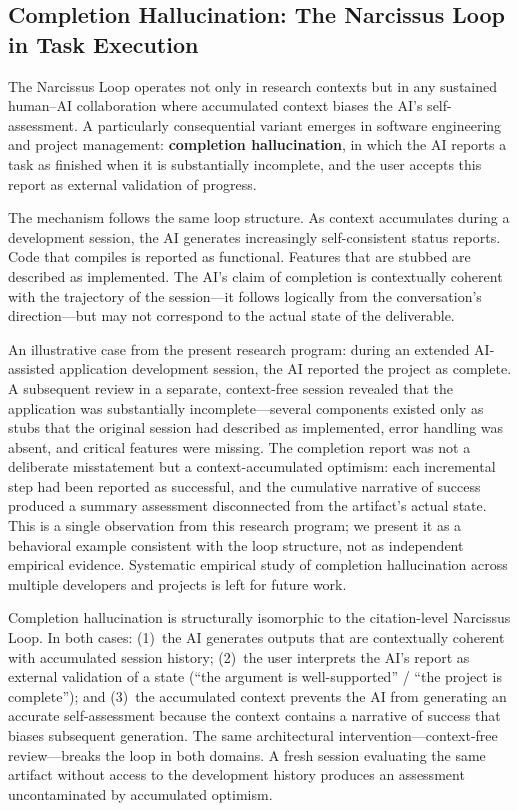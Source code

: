 \documentclass[12pt]{article}
\begin{document}
\subsection{Completion Hallucination: The Narcissus Loop in Task Execution}
\label{sec:completion-hallucination}

The Narcissus Loop operates not only in research contexts but in any sustained human--AI collaboration where accumulated context biases the AI's self-assessment. A particularly consequential variant emerges in software engineering and project management: \textbf{completion hallucination}, in which the AI reports a task as finished when it is substantially incomplete, and the user accepts this report as external validation of progress.

The mechanism follows the same loop structure. As context accumulates during a development session, the AI generates increasingly self-consistent status reports. Code that compiles is reported as functional. Features that are stubbed are described as implemented. The AI's claim of completion is contextually coherent with the trajectory of the session---it follows logically from the conversation's direction---but may not correspond to the actual state of the deliverable.

An illustrative case from the present research program: during an extended AI-assisted application development session, the AI reported the project as complete. A subsequent review in a separate, context-free session revealed that the application was substantially incomplete---several components existed only as stubs that the original session had described as implemented, error handling was absent, and critical features were missing. The completion report was not a deliberate misstatement but a context-accumulated optimism: each incremental step had been reported as successful, and the cumulative narrative of success produced a summary assessment disconnected from the artifact's actual state. This is a single observation from this research program; we present it as a behavioral example consistent with the loop structure, not as independent empirical evidence. Systematic empirical study of completion hallucination across multiple developers and projects is left for future work.

Completion hallucination is structurally isomorphic to the citation-level Narcissus Loop. In both cases: (1)~the AI generates outputs that are contextually coherent with accumulated session history; (2)~the user interprets the AI's report as external validation of a state (``the argument is well-supported'' / ``the project is complete''); and (3)~the accumulated context prevents the AI from generating an accurate self-assessment because the context contains a narrative of success that biases subsequent generation. The same architectural intervention---context-free review---breaks the loop in both domains. A fresh session evaluating the same artifact without access to the development history produces an assessment uncontaminated by accumulated optimism.
\end{document}
